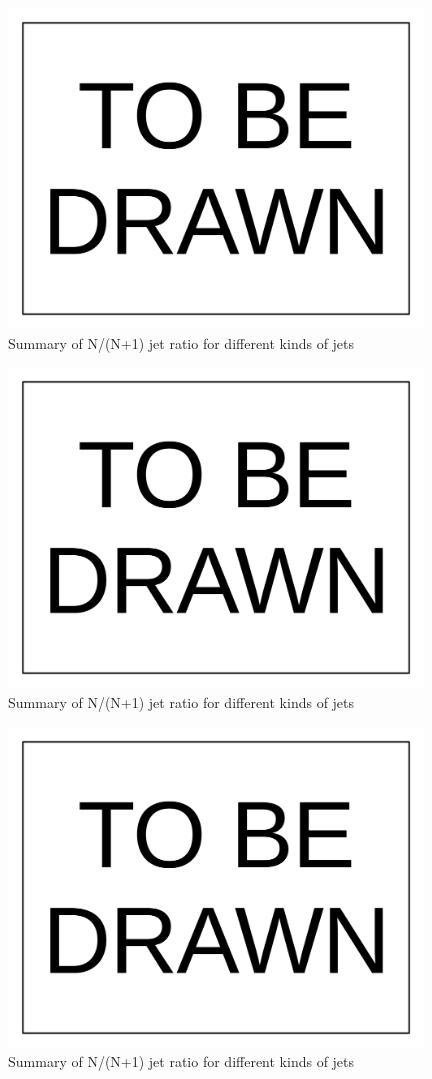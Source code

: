 \documentclass[10pt,a4paper,onecolumn]{article}
\begin{document}
\begin{figure}
   \includegraphics[width=110mm]{ToBeDrawn.pdf}
   \caption{Summary of N/(N+1) jet ratio for different kinds of jets}
   \label{Figure_RatioFromDataCaloJet}
\end{figure}

\begin{figure}
   \includegraphics[width=110mm]{ToBeDrawn.pdf}
   \caption{Summary of N/(N+1) jet ratio for different kinds of jets}
   \label{Figure_RatioFromDataPFJet}
\end{figure}

\begin{figure}
   \includegraphics[width=110mm]{ToBeDrawn.pdf}
   \caption{Summary of N/(N+1) jet ratio for different kinds of jets}
   \label{Figure_RatioFromDataTrackJet}
\end{figure}
\end{document}
